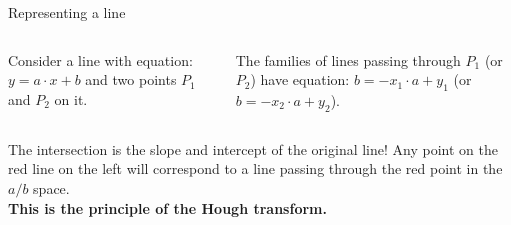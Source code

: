 \documentclass[9pt, aspectratio=169]{beamer}
\begin{document}
\begin{frame}
    {Representing a line}
    \begin{columns}
        \begin{column}{.5\textwidth}

            Consider a line with equation: $y = a\cdot x + b$ and two points $P_1$ and $P_2$ on it.
        \end{column}
        \pause
        \begin{column}{.5\textwidth}

            The families of lines passing through $P_1$ (or $P_2$) have equation: $b = - x_1\cdot a + y_1$ (or $b = - x_2\cdot a + y_2$).
            \pause
        \end{column}
    \end{columns}

    The intersection is the slope and intercept of the original line! Any point on the red line on the left will correspond to a line passing through the red point in the $a/b$ space.\\
    \textbf{This is the principle of the Hough transform.}
\end{frame}
\end{document}

